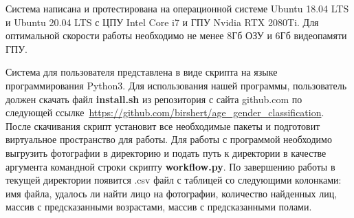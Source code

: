 Система написана и протестирована на операционной системе Ubuntu 18.04 LTS и Ubuntu 20.04 LTS с ЦПУ Intel Core i7 и ГПУ Nvidia RTX 2080Ti\@.
Для оптимальной скорости работы необходимо не менее 8Гб ОЗУ и 6Гб видеопамяти ГПУ.
\par Система для пользователя представлена в виде скрипта на языке программирования Python3.
Для использования нашей программы, пользователь должен скачать файл \textbf{install.sh} из репозитория с сайта github.com по следующей ссылке~\url{https://github.com/birshert/age_gender_classification}.
После скачивания скрипт установит все необходимые пакеты и подготовит виртуальное пространство для работы.
Для работы с программой необходимо выгрузить фотографии в директорию и подать путь к директории в качестве аргумента командной строки скрипту \textbf{workflow.py}.
По завершению работы в текущей директории появится .csv файл с таблицей со следующими колонками: имя файла, удалось ли найти лицо на фотографии,
количество найденных лиц, массив с предсказанными возрастами, массив с предсказанными полами.